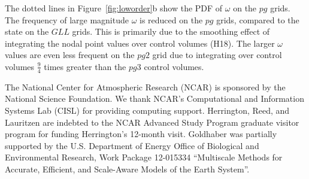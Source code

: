\documentclass{agujournal}
\begin{document}
The dotted lines in Figure~\ref{fig:loworder}b show the PDF of $\omega$ on the $pg$ grids. The frequency of large magnitude $\omega$ is reduced on the $pg$ grids, compared to the state on the $GLL$ grids. This is primarily due to the smoothing effect of integrating the nodal point values over control volumes (H18). The larger $\omega$ values are even less frequent on the $pg2$ grid due to integrating over control volumes $\frac{9}{4}$ times greater than the $pg3$ control volumes. 


%
%
%
%
%
%
%

\acknowledgments
The National Center for Atmospheric Research (NCAR) is sponsored by the National Science Foundation.  We thank NCAR's Computational and Information Systems Lab (CISL) for providing computing support. Herrington, Reed, and Lauritzen are indebted to the NCAR Advanced Study Program graduate visitor program for funding Herrington’s 12-month visit. Goldhaber was partially supported by the U.S. Department of Energy Office of Biological and Environmental Research, Work Package 12-015334 ``Multiscale Methods for Accurate, Efficient, and Scale-Aware Models of the Earth System''.





\end{document}
